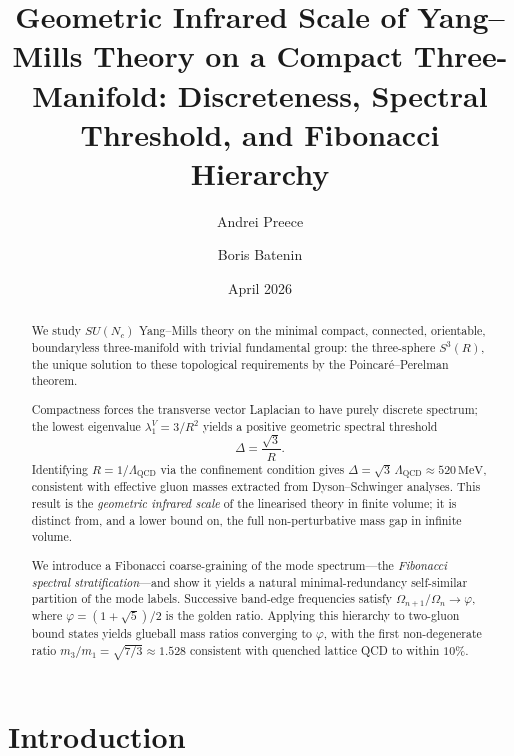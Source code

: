 \documentclass[
  aps,
  prd,
  reprint,
  superscriptaddress,
  nofootinbib,
  longbibliography,
  amsmath,
  amssymb
]{revtex4-2}
\theoremstyle{plain}
\theoremstyle{definition}
\theoremstyle{remark}
\newcommand{\vp}{\varphi}
\newcommand{\Lqcd}{\Lambda_{\mathrm{QCD}}}
\newcommand{\SU}[1]{SU(#1)}
\begin{document}
\title{Geometric Infrared Scale of Yang--Mills Theory on a Compact Three-Manifold: Discreteness, Spectral Threshold, and Fibonacci Hierarchy}

\author{Andrei Preece}

\author{Boris Batenin}

\date{April 2026}

\begin{abstract}
We study $\SU{N_c}$ Yang--Mills theory on the minimal compact, connected,
orientable, boundaryless three-manifold with trivial fundamental group:
the three-sphere $S^3(R)$, the unique solution to these topological requirements
by the Poincar\'e--Perelman theorem.

Compactness forces the transverse vector Laplacian to have purely discrete
spectrum; the lowest eigenvalue $\lambda_1^V = 3/R^2$ yields a positive
geometric spectral threshold
\[
  \Delta = \frac{\sqrt{3}}{R}.
\]
Identifying $R = 1/\Lqcd$ via the confinement condition gives
$\Delta = \sqrt{3}\,\Lqcd \approx 520\,\mathrm{MeV}$,
consistent with effective gluon masses extracted from Dyson--Schwinger
analyses. This result is the \emph{geometric infrared scale} of the
linearised theory in finite volume; it is distinct from, and a lower bound
on, the full non-perturbative mass gap in infinite volume.

We introduce a Fibonacci coarse-graining of the mode spectrum---the
\emph{Fibonacci spectral stratification}---and show it yields a natural minimal-redundancy self-similar partition of the mode labels.
Successive band-edge frequencies satisfy $\Omega_{n+1}/\Omega_n\to\vp$,
where $\vp=(1+\sqrt5)/2$ is the golden ratio. Applying this hierarchy to
two-gluon bound states yields glueball mass ratios converging to $\vp$,
with the first non-degenerate ratio $m_3/m_1 = \sqrt{7/3}\approx1.528$
consistent with quenched lattice QCD to within $10\%$.
\end{abstract}

\maketitle

\section{Introduction}
\label{sec:intro}
\end{document}
